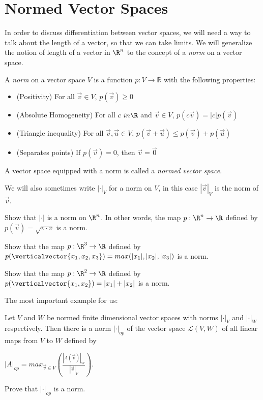 
	\section{Normed Vector Spaces}
	In order to discuss differentiation between vector spaces, we will need a way to talk about the length of a vector, so that we can take limits.  
	We will generalize the notion of length of a vector in $\R^n$ to the concept of a \textit{norm} on a vector space.
	
	\begin{definition}
		A \textit{norm} on a vector space $V$ is a function $p: V \to \mathbb{R}$ with the following properties:
			\begin{itemize}
				\item (Positivity) For all $\vec{v} \in V$, $p(\vec{v}) \geq 0$
				\item (Absolute Homogeneity) For all $c \ in \R$ and $\vec{v} \in V$,  $p(c\vec{v}) = |c|p(\vec{v})$
				\item (Triangle inequality) For all $\vec{v},\vec{u} \in V$, $p(\vec{v}+\vec{u}) \leq p(\vec{v})+p(\vec{u})$
				\item (Separates points) If $p(\vec{v}) =  0$, then $\vec{v} = \vec{0}$
			\end{itemize}
			
			A vector space equipped with a norm is called a \textit{normed vector space}.
	\end{definition}
	
	We will also sometimes write $|\cdot|_V$ for a norm on $V$, in this case $|\vec{v}|_V$ is the norm of $\vec{v}$.
	
	\begin{question}
		Show that $|\cdot|$ is a norm on $\R^n$.  In other words, the map $p:\R^n \to \R$ defined by $p(\vec{v}) = \sqrt{v \cdot v}$ is a norm.
	\end{question}
	
	\begin{question}
		Show that the map $p:\R^3 \to \R$ defined by $p(\verticalvector{x_1,x_2,x_3}) = max(|x_1|,|x_2|,|x_3|)$ is a norm.
	\end{question}
	
	\begin{question}
		Show that the map $p:\R^2 \to \R$ defined by $p(\verticalvector{x_1,x_2}) = |x_1|+|x_2|$ is a norm.
	\end{question}
	
	The most important example for us:  
	
	\begin{question}
		Let $V$ and $W$ be normed finite dimensional vector spaces with norms  $|\cdot|_V$ and $|\cdot|_W$ respectively.  Then there is a norm $|\cdot|_{op}$ of the vector space
		$\mathcal{L}(V,W)$ of all linear maps from $V$ to $W$ defined by
		
		$|A|_{op} = max_{\vec{v} \in V} \left( \frac{|A(\vec{v})|_W}{|\vec{v}|_V}\right)$.
		
		Prove that $|\cdot|_{op}$ is a norm.
	\end{question}
	
